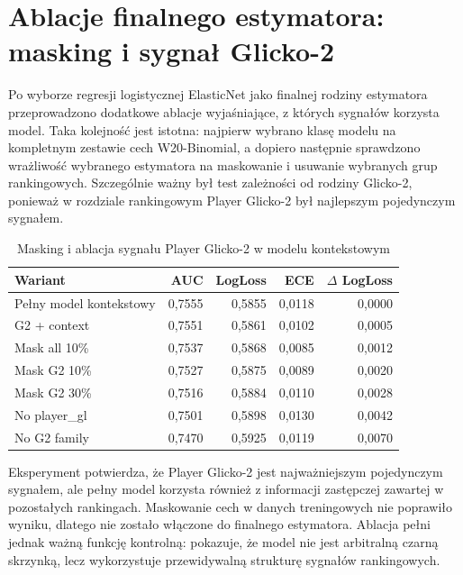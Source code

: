 \section{Ablacje finalnego estymatora: masking i sygnał Glicko-2}

Po wyborze regresji logistycznej ElasticNet jako finalnej rodziny estymatora przeprowadzono dodatkowe ablacje wyjaśniające, z których sygnałów korzysta model. Taka kolejność jest istotna: najpierw wybrano klasę modelu na kompletnym zestawie cech W20-Binomial, a dopiero następnie sprawdzono wrażliwość wybranego estymatora na maskowanie i usuwanie wybranych grup rankingowych. Szczególnie ważny był test zależności od rodziny Glicko-2, ponieważ w rozdziale rankingowym Player Glicko-2 był najlepszym pojedynczym sygnałem.

\begin{table}[H]
    \centering
    \caption{Masking i ablacja sygnału Player Glicko-2 w modelu kontekstowym}
    \label{tab:logistic_masking_ablation}
    \begin{tabular}{lrrrr}
        \toprule
        Wariant & AUC & LogLoss & ECE & $\Delta$ LogLoss \\
        \midrule
        Pełny model kontekstowy & 0{,}7555 & 0{,}5855 & 0{,}0118 & 0{,}0000 \\
        G2 + context & 0{,}7551 & 0{,}5861 & 0{,}0102 & 0{,}0005 \\
        Mask all 10\% & 0{,}7537 & 0{,}5868 & 0{,}0085 & 0{,}0012 \\
        Mask G2 10\% & 0{,}7527 & 0{,}5875 & 0{,}0089 & 0{,}0020 \\
        Mask G2 30\% & 0{,}7516 & 0{,}5884 & 0{,}0110 & 0{,}0028 \\
        No player\_gl & 0{,}7501 & 0{,}5898 & 0{,}0130 & 0{,}0042 \\
        No G2 family & 0{,}7470 & 0{,}5925 & 0{,}0119 & 0{,}0070 \\
        \bottomrule
    \end{tabular}
\end{table}

Eksperyment potwierdza, że Player Glicko-2 jest najważniejszym pojedynczym sygnałem, ale pełny model korzysta również z informacji zastępczej zawartej w pozostałych rankingach. Maskowanie cech w danych treningowych nie poprawiło wyniku, dlatego nie zostało włączone do finalnego estymatora. Ablacja pełni jednak ważną funkcję kontrolną: pokazuje, że model nie jest arbitralną czarną skrzynką, lecz wykorzystuje przewidywalną strukturę sygnałów rankingowych.

